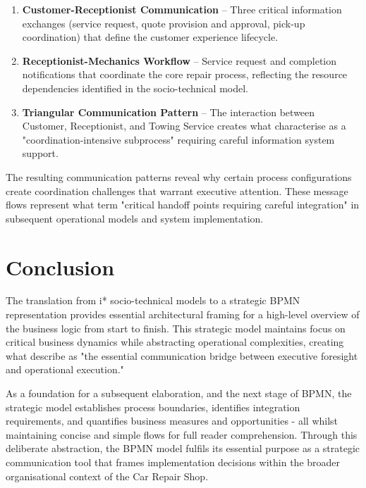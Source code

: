 \documentclass[14pt,a4paper]{article}
\begin{document}
\begin{enumerate}
    \item \textbf{Customer-Receptionist Communication} – Three critical information exchanges (service request, quote provision and approval, pick-up coordination) that define the customer experience lifecycle.

    \item \textbf{Receptionist-Mechanics Workflow} – Service request and completion notifications that coordinate the core repair process, reflecting the resource dependencies identified in the socio-technical model.

    \item \textbf{Triangular Communication Pattern} – The interaction between Customer, Receptionist, and Towing Service creates what \textcite{Corradini2018} characterise as a "coordination-intensive subprocess" requiring careful information system support.
\end{enumerate}

The resulting communication patterns reveal why certain process configurations create coordination challenges that warrant executive attention. These message flows represent what \textcite[p. 195]{Delgado2020} term "critical handoff points requiring careful integration" in subsequent operational models and system implementation.

\section{Conclusion}

The translation from i* socio-technical models to a strategic BPMN representation provides essential architectural framing for a high-level overview of the business logic from start to finish. This strategic model maintains focus on critical business dynamics while abstracting operational complexities, creating what \textcite[p. 103]{Bosch2018} describe as "the essential communication bridge between executive foresight and operational execution."

As a foundation for a subsequent elaboration, and the next stage of BPMN, the strategic model establishes process boundaries, identifies integration requirements, and quantifies business measures and opportunities - all whilst maintaining concise and simple flows for full reader comprehension. Through this deliberate abstraction, the BPMN model fulfils its essential purpose as a strategic communication tool that frames implementation decisions within the broader organisational context of the Car Repair Shop.

\newpage

\printbibliography
\end{document}
